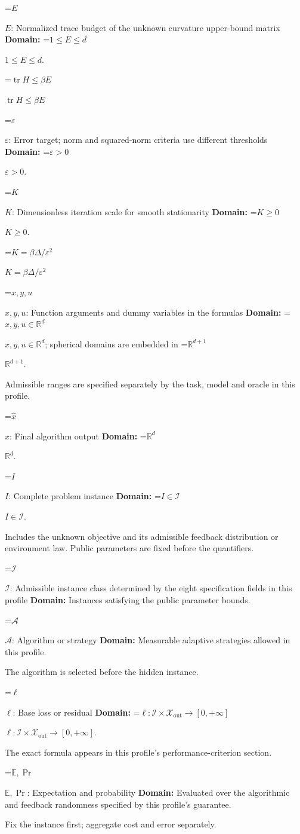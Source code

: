 \documentclass[10pt,a4paper]{article}
\newcommand{\AtlasMath}[1]{\par\begingroup\centering\setbox0=\hbox{$\displaystyle #1$}\ifdim\wd0>1.4\linewidth\typeout{ATLAS WIDE FORMULA: \the\wd0}\fi\ifdim\wd0>\linewidth\resizebox{\linewidth}{!}{\box0}\else\box0\fi\par\endgroup}
\newcommand{\AtlasInlineMath}[1]{\begingroup\setbox0=\hbox{$#1$}\ifdim\wd0>.4\linewidth\endgroup\AtlasMath{#1}\else\endgroup$#1$\fi}
\begin{document}
\AtlasInlineMath{E}: Normalized trace budget of the unknown curvature upper-bound matrix \textbf{Domain:} \AtlasInlineMath{1\le E\le d}.

\AtlasInlineMath{\operatorname{tr}H\le\beta E}

\AtlasInlineMath{\varepsilon}: Error target; norm and squared-norm criteria use different thresholds \textbf{Domain:} \AtlasInlineMath{\varepsilon>0}.

\AtlasInlineMath{K}: Dimensionless iteration scale for smooth stationarity \textbf{Domain:} \AtlasInlineMath{K\ge0}.

\AtlasInlineMath{K=\beta\Delta/\varepsilon^2}

\AtlasInlineMath{x,y,u}: Function arguments and dummy variables in the formulas \textbf{Domain:} \AtlasInlineMath{x,y,u\in\mathbb{R}^d}; spherical domains are embedded in \AtlasInlineMath{\mathbb{R}^{d+1}}.

Admissible ranges are specified separately by the task, model and oracle in this profile.

\AtlasInlineMath{\widehat{x}}: Final algorithm output \textbf{Domain:} \AtlasInlineMath{\mathbb{R}^d}.

\AtlasInlineMath{I}: Complete problem instance \textbf{Domain:} \AtlasInlineMath{I\in\mathcal{I}}.

Includes the unknown objective and its admissible feedback distribution or environment law. Public parameters are fixed before the quantifiers.

\AtlasInlineMath{\mathcal{I}}: Admissible instance class determined by the eight specification fields in this profile \textbf{Domain:} Instances satisfying the public parameter bounds.

\AtlasInlineMath{\mathcal{A}}: Algorithm or strategy \textbf{Domain:} Measurable adaptive strategies allowed in this profile.

The algorithm is selected before the hidden instance.

\AtlasInlineMath{\ell}: Base loss or residual \textbf{Domain:} \AtlasInlineMath{\ell:\mathcal{I}\times\mathcal{X}_{\mathrm{out}}\to[0,+\infty]}.

The exact formula appears in this profile's performance-criterion section.

\AtlasInlineMath{\mathbb{E},\Pr}: Expectation and probability \textbf{Domain:} Evaluated over the algorithmic and feedback randomness specified by this profile's guarantee.

Fix the instance first; aggregate cost and error separately.
\end{document}
